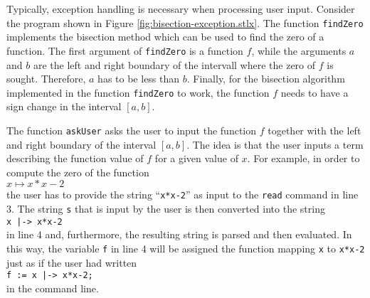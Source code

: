 Typically, exception handling is necessary when  processing user input.  Consider the program
shown in Figure \ref{fig:bisection-exception.stlx}.  The function \texttt{findZero} implements
the bisection method which can be used to find the zero of a function.  The first argument of
\texttt{findZero} is a function $f$, while the arguments $a$ and $b$ are the left and right
boundary of the intervall where the zero of $f$ is sought.  Therefore, $a$ has to be less than
$b$.  Finally, for the bisection algorithm implemented in the function \texttt{findZero} to
work, the function $f$ needs to have a sign change in the interval $[a,b]$.  

The function \texttt{askUser} asks the user to input the function $f$ together with the left and
right boundary of the interval $[a,b]$.  The idea is that the user inputs a term describing the
function value of $f$ for a given value of $x$.  For example, in order to compute the zero of the
function
\\[0.2cm]
\hspace*{1.3cm}
$x \mapsto x*x - 2$
\\[0.2cm]
the user has to provide the string ``\texttt{x*x-2}'' as input to the \texttt{read} command in
line 3.  The string \texttt{s} that is input by the user is then converted into the string
\\[0.2cm]
\hspace*{1.3cm}
\texttt{x |-> x*x-2}
\\[0.2cm]
in line 4 and, furthermore, the resulting string is parsed and then evaluated.  In this way, the
variable \texttt{f} in line 4 will be assigned the function mapping \texttt{x} to \texttt{x*x-2}
just as if the user had written
\\[0.2cm]
\hspace*{1.3cm}
\texttt{f := x |-> x*x-2;}
\\[0.2cm]
in the command line.


